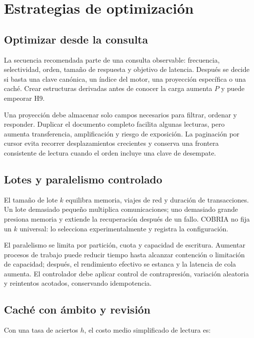 \chapter{Estrategias de optimización}

\section{Optimizar desde la consulta}

La secuencia recomendada parte de una consulta observable: frecuencia, selectividad,
orden, tamaño de respuesta y objetivo de latencia. Después se decide si basta una clave
canónica, un índice del motor, una proyección específica o una caché. Crear estructuras
derivadas antes de conocer la carga aumenta $P$ y puede empeorar H9.

Una proyección debe almacenar solo campos necesarios para filtrar, ordenar y responder.
Duplicar el documento completo facilita algunas lecturas, pero aumenta transferencia,
amplificación y riesgo de exposición. La paginación por cursor evita recorrer desplazamientos
crecientes y conserva una frontera consistente de lectura cuando el orden incluye una
clave de desempate.

\section{Lotes y paralelismo controlado}

El tamaño de lote $k$ equilibra memoria, viajes de red y duración de transacciones. Un
lote demasiado pequeño multiplica comunicaciones; uno demasiado grande presiona memoria
y extiende la recuperación después de un fallo. COBRIA no fija un $k$ universal: lo
selecciona experimentalmente y registra la configuración.

El paralelismo se limita por partición, cuota y capacidad de escritura. Aumentar procesos de trabajo
puede reducir tiempo hasta alcanzar contención o limitación de capacidad; después, el rendimiento efectivo se
estanca y la latencia de cola aumenta. El controlador debe aplicar control de contrapresión, variación aleatoria
y reintentos acotados, conservando idempotencia.

\section{Caché con ámbito y revisión}

Con una tasa de aciertos $h$, el costo medio simplificado de lectura es:

